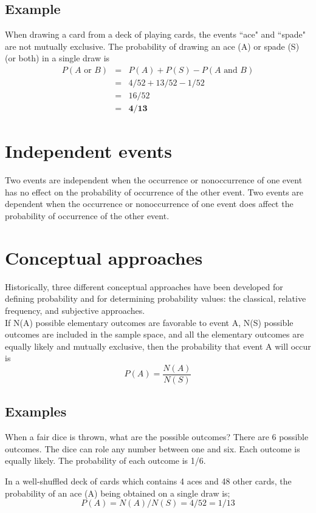 \documentclass[12pt]{article}
\begin{document}
\subsection*{Example}

When drawing a card from a deck of playing cards, the events ``ace" and ``spade" are not mutually
exclusive. The probability of drawing an ace (A) or spade (S) (or both) in a single draw is
\begin{eqnarray*} P(A \mbox{ or }B) &=& P(A) + P(S) - P(A \mbox{ and }B)\\ &=& 4/52 + 13/52 -1/52 \\&=& 16/52 \\
&=& \textbf{4/13} 
\end{eqnarray*}

\section*{Independent events}
Two events are independent when the occurrence or nonoccurrence of one event has no effect on the
probability of occurrence of the other event. Two events are dependent when the occurrence or nonoccurrence
of one event does affect the probability of occurrence of the other event.



\section*{Conceptual approaches}
Historically, three different conceptual approaches have been developed for defining probability and for
determining probability values: the classical, relative frequency, and subjective approaches.\\\noindent If N(A) possible elementary outcomes are favorable to event A,
N(S) possible outcomes are included in the sample space, and all the elementary outcomes are equally likely and
mutually exclusive, then the probability that event A will occur is
\[P(A) = \frac{N(A)}{N(S)}\]

\subsection*{Examples}
When a fair dice is thrown, what are the possible outcomes? There are 6 possible outcomes. The dice can role any number between one and six. Each outcome is equally likely. The probability of each outcome is 1/6.


In a well-shuffled deck of cards which contains 4 aces and 48 other cards, the probability of an ace (A)
being obtained on a single draw is;
\[ P(A)= N(A)/ N(S) = 4/52 = 1/13 \]
\end{document}
